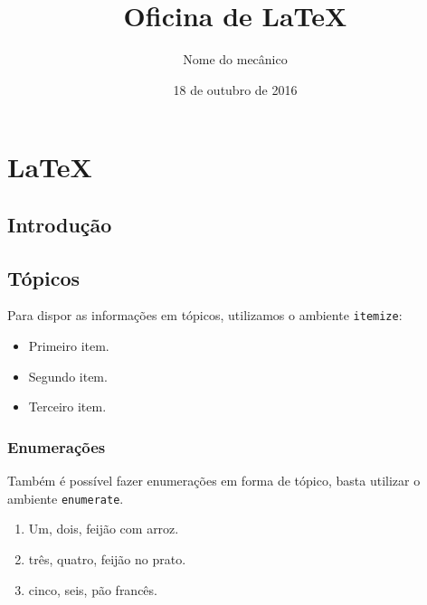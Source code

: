\documentclass{book}
\author{Nome do mecânico} %
\date{18 de outubro de 2016} %
\title{Oficina de \LaTeX} %
\begin{document}
\maketitle %
\tableofcontents 

\chapter{\LaTeX}
\section{Introdução}
\lipsum[3]
\section{Tópicos}
Para dispor as informações em tópicos, utilizamos o ambiente {\tt itemize}:
\begin{itemize}
	\item Primeiro item.
	\item Segundo item.
	\item Terceiro item.
\end{itemize}

\subsection{Enumerações}

Também é possível fazer enumerações em forma de tópico, basta utilizar o ambiente {\tt enumerate}.
\begin{enumerate}
	\item Um, dois, feijão com arroz.
	\item três, quatro, feijão no prato.
	\item cinco, seis, pão francês.
\end{enumerate}
\end{document}
